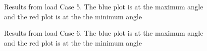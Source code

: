 \begin{figure}[H]
\hfill
{}\hfill
\caption[$\; \:$Results from load Case 5]{Results from load Case 5. The blue plot is at the maximum angle and the red plot is at the the minimum angle}
\label{fig:r5}
\end{figure}

\begin{figure}[H]
\hfill
{}\hfill
\caption[$\; \:$Results from load Case 6]{Results from load Case 6. The blue plot is at the maximum angle and the red plot is at the the minimum angle}
\label{fig:r6}
\end{figure}

